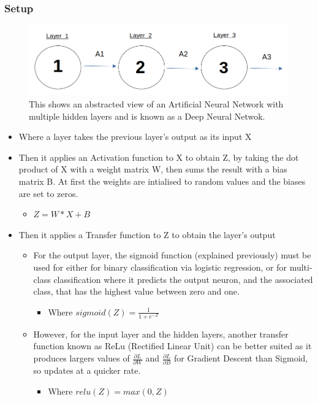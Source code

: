 \documentclass[./project-report/src/latex/project-report.tex]{subfiles}
\begin{document}
\subsubsection{Setup}

\begin{figure}[h!]
\centering
\includegraphics[width=1\textwidth]{./project-report/src/images/deep-ann-diagram.png}
\caption{This shows an abstracted view of an Artificial Neural Network with multiple hidden layers and is known as a Deep Neural Netwok.}
\end{figure}

\begin{itemize}
    \item Where a layer takes the previous layer's output as its input X
    \item Then it applies an Activation function to X to obtain Z, by taking the dot product of X with a weight matrix W, then sums the result with a bias matrix B. At 
          first the weights are intialised to random values and the biases are set to zeros.
    \begin{itemize}
        \item $Z = W * X + B$
    \end{itemize}
    \item Then it applies a Transfer function to Z to obtain the layer's output
    \begin{itemize}
        \item For the output layer, the sigmoid function (explained previously) must be used for either for binary classification via logistic regression, or for multi-
              class classification where it predicts the output neuron, and the associated class, that has the highest value between zero and one.
        \begin{itemize}
            \item Where $sigmoid(Z) = \frac{1}{1+e^{-Z}}$
        \end{itemize}
        \item However, for the input layer and the hidden layers, another transfer function known as ReLu (Rectified Linear Unit) can be better suited as it produces 
              largers values of $\frac{\partial{L}}{\partial{W}}$ and $\frac{\partial{L}}{\partial{B}}$ for Gradient Descent than Sigmoid, so updates at a quicker rate.
        \begin{itemize}
            \item Where $relu(Z) = max(0, Z)$
        \end{itemize}
    \end{itemize}
\end{itemize}
\end{document}
